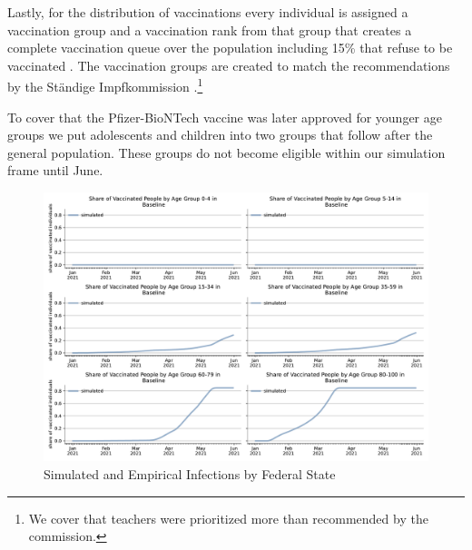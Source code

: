 Lastly, for the distribution of vaccinations every individual is assigned a vaccination
group and a vaccination rank from that group that creates a complete vaccination queue
over the population including 15\% that refuse to be vaccinated \citep{RKI2021c}. The
vaccination groups are created to match the recommendations by the Ständige
Impfkommission \citep{VygenBonnet2020}.\footnote{We cover that teachers were prioritized
more than recommended by the commission.}

To cover that the Pfizer-BioNTech vaccine was later approved for younger age groups we
put adolescents and children into two groups that follow after the general population.
These groups do not become eligible within our simulation frame until June.


\begin{figure}[ht]   %
  \centering
  \includegraphics[width=\textwidth]{figures/results/figures/vaccinations/spring_baseline}
  \caption{Simulated and Empirical Infections by Federal State}
  \label{fig:vaccinations_by_age_group}
\end{figure}


\FloatBarrier
